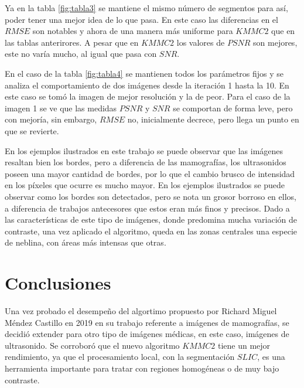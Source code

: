 \documentclass[a4paper,10pt,twocolumn]{article}
\begin{document}
Ya en la tabla \ref{fig:tabla3} se mantiene el mismo n\'umero de segmentos para as\'i, poder tener una mejor idea de lo que pasa. En este caso las diferencias en el $RMSE$ son notables y ahora de una manera m\'as uniforme para $KMMC2$ que en las tablas anterirores. A pesar que en $KMMC2$ los valores de $PSNR$ son mejores, este no var\'ia mucho, al igual que pasa con $SNR$.

En el caso de la tabla \ref{fig:tabla4} se mantienen todos los par\'ametros fijos y se analiza el comportamiento de dos im\'agenes desde la iteraci\'on 1 hasta la 10. En este caso se tom\'o la imagen de mejor resoluci\'on y la de peor. Para el caso de la imagen 1 se ve que las medidas $PSNR$ y $SNR$ se comportan de forma leve, pero con mejor\'ia, sin embargo, $RMSE$ no, inicialmente decrece, pero llega un punto en que se revierte.

En los ejemplos ilustrados en este trabajo se puede observar que las im\'agenes resaltan bien los bordes, pero a diferencia de las mamograf\'ias, los ultrasonidos poseen una mayor cantidad de bordes, por lo que el cambio brusco de intensidad en los p\'ixeles que ocurre es mucho mayor. En los ejemplos ilustrados se puede observar como los bordes son detectados, pero se nota un grosor borroso en ellos, a diferencia de trabajos antecesores que estos eran m\'as finos y precisos. Dado a las caracter\'isticas de este tipo de im\'agenes, donde predomina mucha variaci\'on de contraste, una vez aplicado el algoritmo, queda en las zonas centrales una especie de neblina, con \'areas m\'as intensas que otras.
  
\section{Conclusiones}\label{sec:conclusiones}

Una vez probado el desempe\~no del algortimo propuesto por Richard Miguel M\'endez Castillo en 2019 en su trabajo referente a im\'agenes de mamograf\'ias, se decidi\'o extender para otro tipo de im\'agenes m\'edicas, en este caso, im\'agenes de ultrasonido. Se corrobor\'o que el nuevo algoritmo $KMMC2$ tiene un mejor rendimiento, ya que el procesamiento local, con la segmentación $SLIC$, es una herramienta importante para tratar con regiones homog\'eneas o de muy bajo contraste.
\end{document}
